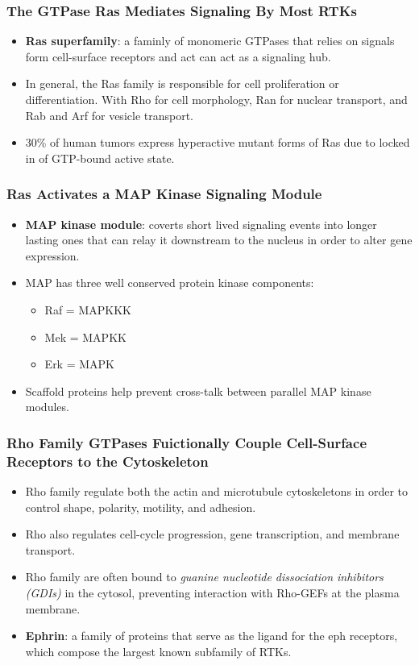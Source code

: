 \documentclass[12pt,a4paper]{article}
\begin{document}
\subsubsection{The GTPase Ras Mediates Signaling By Most RTKs}
\begin{itemize}
    \item \textbf{Ras superfamily}: a faminly of monomeric GTPases that relies on signals form cell-surface receptors and act can act as a signaling hub.
    \item In general, the Ras family is responsible for cell proliferation or differentiation. With Rho for cell morphology, Ran for nuclear transport, and Rab and Arf for vesicle transport.
    \item 30\% of human tumors express hyperactive mutant forms of Ras due to locked in of GTP-bound active state.
\end{itemize}

\subsubsection{Ras Activates a MAP Kinase Signaling Module}
\begin{itemize}
    \item \textbf{MAP kinase module}: coverts short lived signaling events into longer lasting ones that can relay it downstream to the nucleus in order to alter gene expression.
    \item MAP has three well conserved protein kinase components:
        \begin{itemize}
            \item Raf = MAPKKK
            \item Mek = MAPKK
            \item Erk = MAPK 
        \end{itemize}
    \item Scaffold proteins help prevent cross-talk between parallel MAP kinase modules.
\end{itemize}

\subsubsection{Rho Family GTPases Fuictionally Couple Cell-Surface Receptors to the Cytoskeleton}
\begin{itemize}
    \item Rho family regulate both the actin and microtubule cytoskeletons in order to control shape, polarity, motility, and adhesion.
    \item Rho also regulates cell-cycle progression, gene transcription, and membrane transport.
    \item Rho family are often bound to \textit{guanine nucleotide dissociation inhibitors (GDIs)} in the cytosol, preventing interaction with Rho-GEFs at the plasma membrane.
    \item \textbf{Ephrin}: a family of proteins that serve as the ligand for the eph receptors, which compose the largest known subfamily of RTKs.
\end{itemize}
\end{document}

